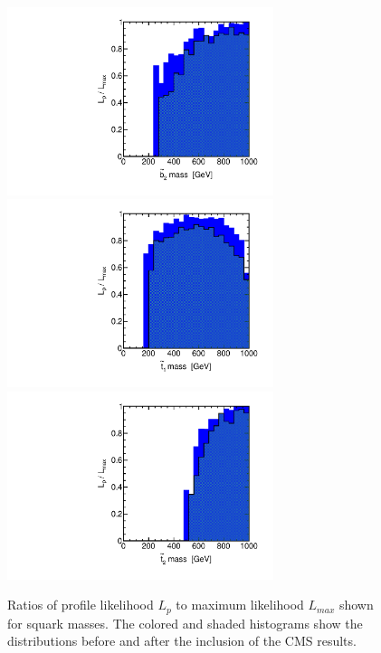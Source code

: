 \begin{figure}[htbp]
\begin{center}
\includegraphics[height=5.5cm]{figs/fig_b_2.pdf} \\
\includegraphics[height=5.5cm]{figs/fig_t_1.pdf} 
\includegraphics[height=5.5cm]{figs/fig_t_2.pdf} \\
\caption{Ratios of profile likelihood $L_p$ to maximum likelihood $L_{max}$ shown for squark masses.  The colored and shaded histograms show the distributions before and after the inclusion of the CMS results.}
\label{fig:LRwcms_sq}
\end{center}
\end{figure}


